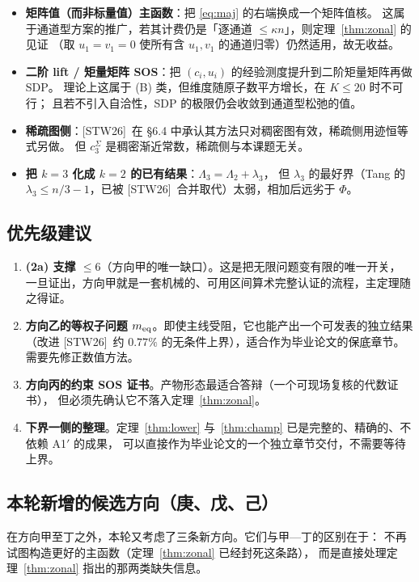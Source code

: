 \documentclass[UTF8,11pt]{ctexart}
\theoremstyle{definition}
\newcommand{\Lam}{\Lambda}
\newcommand{\STW}{\textup{[STW26]}}
\begin{document}
\begin{itemize}[leftmargin=1.4em,itemsep=2pt]
\item \textbf{矩阵值（而非标量值）主函数}：把 \eqref{eq:maj} 的右端换成一个矩阵值核。
这属于通道型方案的推广，若其计费仍是「逐通道 $\le\kappa n$」，则定理~\ref{thm:zonal} 的见证
（取 $u_1=v_1=0$ 使所有含 $u_1,v_1$ 的通道归零）仍然适用，故无收益。
\item \textbf{二阶 lift / 矩量矩阵 SOS}：把 $(c_i,u_i)$ 的经验测度提升到二阶矩量矩阵再做 SDP。
理论上这属于 (B) 类，但维度随原子数平方增长，在 $K\le20$ 时不可行；
且若不引入自洽性，SDP 的极限仍会收敛到通道型松弛的值。
\item \textbf{稀疏图侧}：\STW\ 在 \S6.4 中承认其方法只对稠密图有效，稀疏侧用迹恒等式另做。
但 $c_3^{\Sigma}$ 是稠密渐近常数，稀疏侧与本课题无关。
\item \textbf{把 $k=3$ 化成 $k=2$ 的已有结果}：$\Lam_3=\Lam_2+\lambda_3$，
但 $\lambda_3$ 的最好界（Tang 的 $\lambda_3\le n/3-1$，已被 \STW\ 合并取代）太弱，相加后远劣于 $\Phi$。
\end{itemize}

\subsection{优先级建议}

\begin{enumerate}[leftmargin=1.8em,itemsep=2pt]
\item \textbf{(2a) 支撑 $\le6$}（方向甲的唯一缺口）。这是把无限问题变有限的唯一开关，
一旦证出，方向甲就是一套机械的、可用区间算术完整认证的流程，主定理随之得证。
\item \textbf{方向乙的等权子问题 $m_{\rm eq}$}。即使主线受阻，它也能产出一个可发表的独立结果
（改进 \STW\ 约 $0.77\%$ 的无条件上界），适合作为毕业论文的保底章节。需要先修正数值方法。
\item \textbf{方向丙的约束 SOS 证书}。产物形态最适合答辩（一个可现场复核的代数证书），
但必须先确认它不落入定理~\ref{thm:zonal}。
\item \textbf{下界一侧的整理}。定理~\ref{thm:lower} 与~\ref{thm:champ} 已是完整的、精确的、不依赖 A1$'$ 的成果，
可以直接作为毕业论文的一个独立章节交付，不需要等待上界。
\end{enumerate}

\subsection{本轮新增的候选方向（庚、戊、己）}

在方向甲至丁之外，本轮又考虑了三条新方向。它们与甲—丁的区别在于：
不再试图构造更好的主函数（定理~\ref{thm:zonal} 已经封死这条路），
而是直接处理定理~\ref{thm:zonal} 指出的那两类缺失信息。
\end{document}
